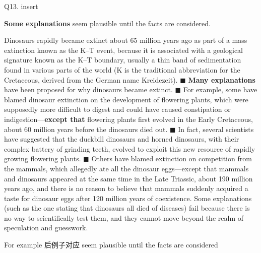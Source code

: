 \begin{blk}
    \begin{qst}
        Q13. insert

        \textbf{Some explanations} seem plausible until the facts are considered.
    \end{qst}

    \begin{psgq}
        Dinosaurs rapidly became extinct about 65 million years ago as part of a mass extinction known as the K–T event, because it is associated with a geological signature known as the K–T boundary, usually a thin band of sedimentation found in various parts of the world (K is the traditional abbreviation for the Cretaceous, derived from the German name Kreidezeit). $\blacksquare$ \textbf{Many explanations} have been proposed for why dinosaurs became extinct. $\blacksquare$ For example, some have blamed dinosaur extinction on the development of flowering plants, which were supposedly more difficult to digest and could have caused constipation or indigestion—\textbf{except that} flowering plants first evolved in the Early Cretaceous, about 60 million years before the dinosaurs died out. $\blacksquare$ In fact, several scientists have suggested that the duckbill dinosaurs and horned dinosaurs, with their complex battery of grinding teeth, evolved to exploit this new resource of rapidly growing flowering plants. $\blacksquare$ Others have blamed extinction on competition from the mammals, which allegedly ate all the dinosaur eggs—except that mammals and dinosaurs appeared at the same time in the Late Triassic, about 190 million years ago, and there is no reason to believe that mammals suddenly acquired a taste for dinosaur eggs after 120 million years of coexistence. Some explanations (such as the one stating that dinosaurs all died of diseases) fail because there is no way to scientifically test them, and they cannot move beyond the realm of speculation and guesswork.
    \end{psgq}

    \begin{nlz}
        For example 后例子对应 seem plausible until the facts are considered
    \end{nlz}
\end{blk}
